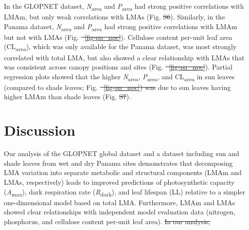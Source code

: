 \documentclass[
  12pt,
  letterpaper,
  DIV=11,
  numbers=noendperiod]{scrartcl}
\providecommand{\DIFadd}[1]{{\protect\color{blue}\uwave{#1}}} %
\providecommand{\DIFdel}[1]{{\protect\color{red}\sout{#1}}}                      %
\providecommand{\DIFaddbegin}{} %
\providecommand{\DIFaddend}{} %
\providecommand{\DIFdelbegin}{} %
\providecommand{\DIFdelend}{} %
\newcommand{\DIFscaledelfig}{0.5}
\newlength{\DIFdelgraphicswidth} %
\newlength{\DIFdelgraphicsheight} %
\newcommand{\DIFaddincludegraphics}[2][]{{\color{blue}\fbox{\DIFOincludegraphics[#1]{#2}}}} %
\newcommand{\DIFdelincludegraphics}[2][]{%
\sbox{\DIFdelgraphicsbox}{\DIFOincludegraphics[#1]{#2}}%
\settoboxwidth{\DIFdelgraphicswidth}{\DIFdelgraphicsbox} %
\settoboxtotalheight{\DIFdelgraphicsheight}{\DIFdelgraphicsbox} %
\scalebox{\DIFscaledelfig}{%
\parbox[b]{\DIFdelgraphicswidth}{\usebox{\DIFdelgraphicsbox}\\[-\baselineskip] \rule{\DIFdelgraphicswidth}{0em}}\llap{\resizebox{\DIFdelgraphicswidth}{\DIFdelgraphicsheight}{%
\setlength{\unitlength}{\DIFdelgraphicswidth}%
\begin{picture}(1,1)%
\thicklines\linethickness{2pt} %
{\color[rgb]{1,0,0}\put(0,0){\framebox(1,1){}}}%
{\color[rgb]{1,0,0}\put(0,0){\line( 1,1){1}}}%
{\color[rgb]{1,0,0}\put(0,1){\line(1,-1){1}}}%
\end{picture}%
}\hspace*{3pt}}} %
} %
\DeclareRobustCommand{\DIFaddbegin}{\DIFOaddbegin \let\includegraphics\DIFaddincludegraphics} %
\DeclareRobustCommand{\DIFaddend}{\DIFOaddend \let\includegraphics\DIFOincludegraphics} %
\DeclareRobustCommand{\DIFdelbegin}{\DIFOdelbegin \let\includegraphics\DIFdelincludegraphics} %
\DeclareRobustCommand{\DIFdelend}{\DIFOaddend \let\includegraphics\DIFOincludegraphics} %
\begin{document}
In the GLOPNET dataset, \emph{N}\textsubscript{area} and
\emph{P}\textsubscript{area} had strong positive correlations with LMAm,
but only weak correlations with LMAs (Fig. \DIFdelbegin \DIFdel{S6}\DIFdelend \DIFaddbegin \DIFadd{S7}\DIFaddend ). Similarly, in the Panama
dataset, \emph{N}\textsubscript{area} and \emph{P}\textsubscript{area}
had strong positive correlations with LMAm but not with LMAs (Fig. \DIFdelbegin \DIFdel{~\ref{fig-pa_npc}}\DIFdelend \DIFaddbegin \DIFadd{S8}\DIFaddend ).
Cellulose content per-unit leaf area (CL\textsubscript{area}), which was
only available for the Panama dataset, was most strongly correlated with
total LMA, but also showed a clear relationship with LMAs that was
consistent across canopy positions and sites (Fig. \DIFdelbegin \DIFdel{~\ref{fig-pa_npc}}\DIFdelend \DIFaddbegin \DIFadd{S8}\DIFaddend ). Partial
regression plots showed that the higher \emph{N}\textsubscript{area},
\emph{P}\textsubscript{area}, and CL\textsubscript{area} in sun leaves
(compared to shade leaves; Fig. \DIFdelbegin \DIFdel{~\ref{fig-pa_npc}) was }\DIFdelend \DIFaddbegin \DIFadd{S8) were primarily }\DIFaddend due to sun leaves
having higher LMAm than shade leaves (Fig. \DIFdelbegin \DIFdel{S7}\DIFdelend \DIFaddbegin \DIFadd{S9}\DIFaddend ).

\section{Discussion}\label{discussion}

Our analysis of the GLOPNET global dataset and a dataset including sun
and shade leaves from wet and dry Panama sites demonstrates that
decomposing LMA variation into separate metabolic and structural
components (LMAm and LMAs, respectively) leads to improved predictions
of photosynthetic capacity (\emph{A}\textsubscript{max}), dark
respiration rate (\emph{R}\textsubscript{dark}), and leaf lifespan (LL)
relative to a simpler one-dimensional model based on total LMA.
Furthermore, LMAm and LMAs showed clear relationships with independent
model evaluation data (nitrogen, phosphorus, and cellulose content
per-unit leaf area).
\DIFdelbegin \DIFdel{In our analysis, }\DIFdelend \DIFaddbegin 
\end{document}
